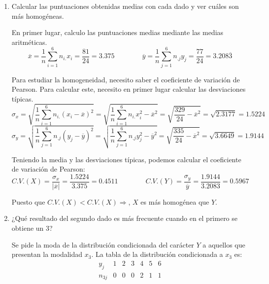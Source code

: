 \begin{ejercicio}
\begin{enumerate}
        \item Calcular las puntuaciones obtenidas medias con cada dado y ver cuáles son más homogéneas.

        En primer lugar, calculo las puntuaciones medias mediante las medias aritméticas.
        \begin{equation*}
            \overline{x} = \frac{1}{n} \sum_{i=1}^6 n_{i.}x_i = \frac{81}{24} = 3.375
            \qquad \qquad
            \overline{y} = \frac{1}{n} \sum_{j=1}^{6}n_{.j}y_{j} = \frac{77}{24} = 3.208\overline{3}
        \end{equation*}

        Para estudiar la homogeneidad, necesito saber el coeficiente de variación de Pearson. Para calcular este, necesito en primer lugar calcular las desviaciones típicas.
        \begin{equation*}
            \sigma_{x} = \sqrt{\frac{1}{n}\sum_{i=1}^{6} n_{i.}(x_{i} - \overline{x})^2}
            = \sqrt{\frac{1}{n}\sum_{i=1}^{6} n_{i.}x_{i}^2 - \overline{x}^2}= \sqrt{\frac{329}{24}-\overline{x}^2} = \sqrt{2.3177} = 1.5224
        \end{equation*}
        \begin{equation*}
            \sigma_{y} = \sqrt{\frac{1}{n}\sum_{j=1}^{6} n_{.j}(y_{j} - \overline{y})^2}
            = \sqrt{\frac{1}{n}\sum_{j=1}^{6} n_{.j}y_{j}^2 - \overline{y}^2}= \sqrt{\frac{335}{24}-\overline{x}^2} = \sqrt{3.6649} = 1.9144
        \end{equation*}

        Teniendo la media y las desviaciones típicas, podemos calcular el coeficiente de variación de Pearson:
        \begin{equation*}
            C.V.(X)=\frac{\sigma_{x}}{|\overline{x}|} = \frac{1.5224}{3.375} = 0.4511
            \qquad \qquad
            C.V.(Y)=\frac{\sigma_{y}}{\overline{y}} = \frac{1.9144}{3.2083} = 0.5967
        \end{equation*}

        Puesto que $C.V.(X) < C.V.(X) \Longrightarrow$, $X$ es más homogénea que $Y$.

        \item ¿Qué resultado del segundo dado es más frecuente cuando en el primero se obtiene un 3?

        Se pide la moda de la distribución condicionada del carácter $Y$ a aquellos que presentan la modalidad $x_3$. La tabla de la distribución condicionada a $x_3$ es:
        \begin{equation*}
            \begin{array}{c|cccccc}
                y_j & 1 & 2 & 3 & 4 & 5 & 6 \\ \hline
                n_{3j} &0  & 0 &0  & 2 & 1 & 1
            \end{array}
        \end{equation*}


\end{enumerate}
\end{ejercicio}
